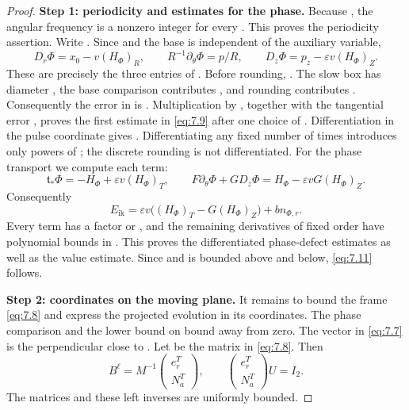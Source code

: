 \begin{proof}
\textbf{Step 1: periodicity and estimates for the phase.}
Because , the angular
frequency  is a nonzero integer for every . This proves the periodicity assertion.
Write . Since  and the base is independent of the auxiliary
variable,
\[
D_r\Phi=x_0-v(H_\Phi)_R,\qquad
R^{-1}\partial_\theta\Phi=p/R,\qquad
D_z\Phi=p_z-\varepsilon v(H_\Phi)_Z.
\]
These are precisely the three entries of . Before rounding, .
The slow box has diameter , the base comparison contributes , and rounding
contributes . Consequently the error in  is . Multiplication by , together with the tangential error , proves the first estimate
in \eqref{eq:7.9} after one choice of . Differentiation in the pulse coordinate gives .
Differentiating any fixed number of times introduces only powers of ; the discrete rounding
is not differentiated. For the phase transport we compute each term:
\[
\mathfrak t_*\Phi=-H_\Phi+\varepsilon v(H_\Phi)_T,
\qquad
F\partial_\theta\Phi+GD_z\Phi=H_\Phi-\varepsilon vG(H_\Phi)_Z.
\]
Consequently
\[
E_{\mathrm{ik}}=\varepsilon v\bigl((H_\Phi)_T-G(H_\Phi)_Z\bigr)+bn_{\Phi,r}.
\]
Every term has a factor  or , and the remaining derivatives of fixed order have
polynomial bounds in . This proves the differentiated phase-defect estimates as well as
the value estimate. Since  and  is bounded above and below, \eqref{eq:7.11} follows.

\textbf{Step 2: coordinates on the moving plane.}
It remains to bound the frame \eqref{eq:7.8} and express
the projected evolution in its coordinates. The phase comparison and the lower bound on 
bound  away from zero. The vector  in \eqref{eq:7.7} is the perpendicular close to . Let 
be the  matrix in \eqref{eq:7.8}. Then
\[
B^\ell=M^{-1}
\begin{pmatrix}e_r^T\\N_a^T\end{pmatrix},
\qquad
\begin{pmatrix}e_r^T\\N_a^T\end{pmatrix}U=I_2.
\]
The matrices  and these left inverses are uniformly bounded.


\end{proof}
